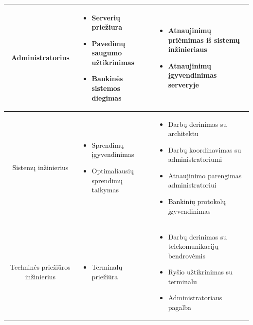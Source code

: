 \documentclass[10pt]{IEEEtran}
\begin{document}
\begin{table}[t]
\begin{tabular}{|c|p{5cm}|p{5cm}|}
                    Administratorius &
                    \begin{itemize} 
                        \item Serverių priežiūra
                        \item Pavedimų saugumo užtikrinimas
                        \item Bankinės sistemos diegimas
                    \end{itemize} &
                    \begin{itemize}
                        \item Atnaujinimų priėmimas iš sistemų inžinieriaus
                        \item Atnaujinimų įgyvendinimas serveryje
                    \end{itemize} \\ \hline

                    Sistemų inžinierius &
                    \begin{itemize} 
                    \item Sprendimų įgyvendinimas
                    \item Optimaliausių sprendimų taikymas
                    \end{itemize}& 
                    \begin{itemize}
                    \item Darbų derinimas su architektu
                    \item Darbų koordinavimas su administratoriumi
                    \item Atnaujinimo parengimas administratoriui
                    \item Bankinių protokolų įgyvendinimas
                    \end{itemize}\\ \hline

                    Techninės priežiūros inžinierius &
                    \begin{itemize}
                    \item Terminalų priežiūra
                    \end{itemize} & 
                    \begin{itemize}
                    \item Darbų derinimas su telekomunikacijų bendrovėmis
                    \item Ryšio užtikrinimas su terminalu
                    \item Administratoriaus pagalba
                    \end{itemize}\\ \hline


\end{tabular}
\end{table}
\end{document}

